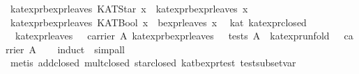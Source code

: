 \begin{isabellebody}
{}\ {}kat{}expr{}bexpr{}leaves\ {}KATStar\ x{}\ {}\ kat{}expr{}bexpr{}leaves\ x{}\isanewline
{}\ {}kat{}expr{}bexpr{}leaves\ {}KATBool\ x{}\ {}\ bexpr{}leaves\ x{}\isanewline
\isanewline
{}\isamarkupfalse%
\ {}\ kat{}\ kat{}expr{}closed{}\isanewline
\ \ {}{}kat{}expr{}leaves\ {}\ {}\ carrier\ A{}\ kat{}expr{}bexpr{}leaves\ {}\ {}\ tests\ A{}\ {}\ kat{}expr{}unfold\ {}\ {}\ carrier\ A{}\isanewline
%
\isadelimproof
\ \ %
\endisadelimproof
%
\isatagproof
{}\isamarkupfalse%
\ {}induct\ {}{}\ simp{}all{}\isanewline
\ \ \isamarkupfalse%
\ {}metis\ add{}closed\ mult{}closed\ star{}closed\ kat{}bexpr{}test\ test{}subset{}var{}{}%

\end{isabellebody}
